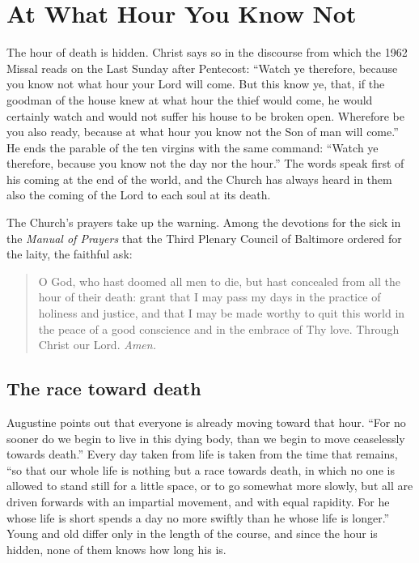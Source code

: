 \section{At What Hour You Know Not}

The hour of death is hidden. Christ says so in the discourse from which the 1962 Missal reads on the Last Sunday after Pentecost: ``Watch ye therefore, because you know not what hour your Lord will come. But this know ye, that, if the goodman of the house knew at what hour the thief would come, he would certainly watch and would not suffer his house to be broken open. Wherefore be you also ready, because at what hour you know not the Son of man will come.'' He ends the parable of the ten virgins with the same command: ``Watch ye therefore, because you know not the day nor the hour.'' The words speak first of his coming at the end of the world, and the Church has always heard in them also the coming of the Lord to each soul at its death.

The Church's prayers take up the warning. Among the devotions for the sick in the \emph{Manual of Prayers} that the Third Plenary Council of Baltimore ordered for the laity, the faithful ask:

\ifdefined\TriptychPrintEdition
{}
\else
\fi
\begin{quote}
O God, who hast doomed all men to die, but hast concealed from all the hour of their death: grant that I may pass my days in the practice of holiness and justice, and that I may be made worthy to quit this world in the peace of a good conscience and in the embrace of Thy love. Through Christ our Lord. \emph{Amen.}
\end{quote}

\subsection{The race toward death}

Augustine points out that everyone is already moving toward that hour. ``For no sooner do we begin to live in this dying body, than we begin to move ceaselessly towards death.'' Every day taken from life is taken from the time that remains, ``so that our whole life is nothing but a race towards death, in which no one is allowed to stand still for a little space, or to go somewhat more slowly, but all are driven forwards with an impartial movement, and with equal rapidity. For he whose life is short spends a day no more swiftly than he whose life is longer.'' Young and old differ only in the length of the course, and since the hour is hidden, none of them knows how long his is.

